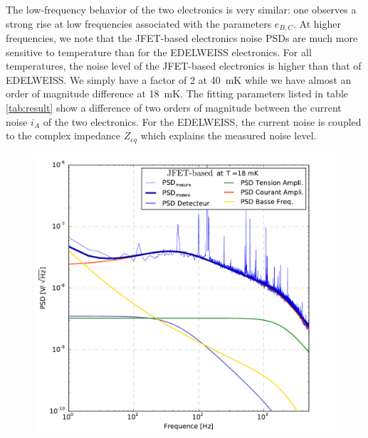The low-frequency behavior of the two electronics is very similar: one observes a strong rise at low frequencies associated with the parameters $e_{B,C}$. At higher frequencies, we note that the JFET-based electronics noise PSDs are much more sensitive to temperature than for the EDELWEISS electronics. For all temperatures, the noise level of the JFET-based electronics is higher than that of EDELWEISS. We simply have a factor of 2 at \SI{40}{\milli\kelvin} while we have almost an order of magnitude difference at \SI{18}{\milli\kelvin}. The fitting parameters listed in table \ref{tab:result} show a difference of two orders of magnitude between the current noise $i_A$ of the two electronics. For the EDELWEISS, the current noise is coupled to the complex impedance $Z_{eq}$ which explains the measured noise level.

\begin{figure}
\begin{minipage}{0.49\textwidth}
\includegraphics[width=\textwidth]{Figures/Ethem/cuore_18.pdf}
\end{minipage}
\hfill
\begin{minipage}{0.49\textwidth}

\end{minipage}
\end{figure}
